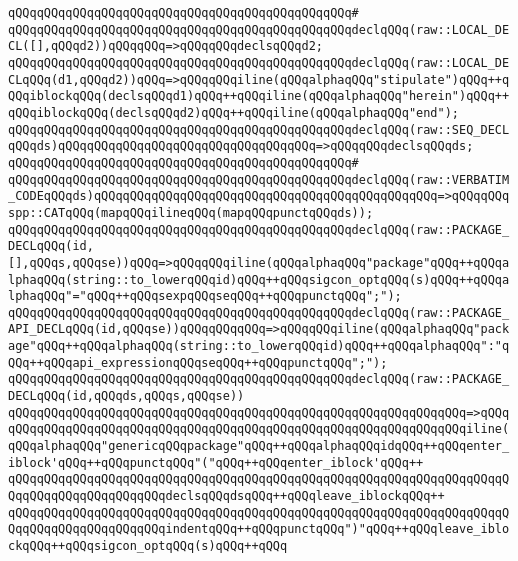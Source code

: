 \verb|qQQqqQQqqQQqqQQqqQQqqQQqqQQqqQQqqQQqqQQqqQQqqQQq#|\newline
\verb|qQQqqQQqqQQqqQQqqQQqqQQqqQQqqQQqqQQqqQQqqQQqqQQqdeclqQQq(raw::LOCAL_DECL([],qQQqd2))qQQqqQQq=>qQQqqQQqdeclsqQQqd2;|\newline
\verb|qQQqqQQqqQQqqQQqqQQqqQQqqQQqqQQqqQQqqQQqqQQqqQQqdeclqQQq(raw::LOCAL_DECLqQQq(d1,qQQqd2))qQQq=>qQQqqQQqiline(qQQqalphaqQQq"stipulate")qQQq++qQQqiblockqQQq(declsqQQqd1)qQQq++qQQqiline(qQQqalphaqQQq"herein")qQQq++qQQqiblockqQQq(declsqQQqd2)qQQq++qQQqiline(qQQqalphaqQQq"end");|\newline
\verb|qQQqqQQqqQQqqQQqqQQqqQQqqQQqqQQqqQQqqQQqqQQqqQQqdeclqQQq(raw::SEQ_DECLqQQqds)qQQqqQQqqQQqqQQqqQQqqQQqqQQqqQQqqQQq=>qQQqqQQqdeclsqQQqds;|\newline
\verb|qQQqqQQqqQQqqQQqqQQqqQQqqQQqqQQqqQQqqQQqqQQqqQQq#|\newline
\verb|qQQqqQQqqQQqqQQqqQQqqQQqqQQqqQQqqQQqqQQqqQQqqQQqdeclqQQq(raw::VERBATIM_CODEqQQqds)qQQqqQQqqQQqqQQqqQQqqQQqqQQqqQQqqQQqqQQqqQQqqQQq=>qQQqqQQqspp::CATqQQq(mapqQQqilineqQQq(mapqQQqpunctqQQqds));|\newline
\verb|qQQqqQQqqQQqqQQqqQQqqQQqqQQqqQQqqQQqqQQqqQQqqQQqdeclqQQq(raw::PACKAGE_DECLqQQq(id,[],qQQqs,qQQqse))qQQq=>qQQqqQQqiline(qQQqalphaqQQq"package"qQQq++qQQqalphaqQQq(string::to_lowerqQQqid)qQQq++qQQqsigcon_optqQQq(s)qQQq++qQQqalphaqQQq"="qQQq++qQQqsexpqQQqseqQQq++qQQqpunctqQQq";");|\newline
\verb|qQQqqQQqqQQqqQQqqQQqqQQqqQQqqQQqqQQqqQQqqQQqqQQqdeclqQQq(raw::PACKAGE_API_DECLqQQq(id,qQQqse))qQQqqQQqqQQq=>qQQqqQQqiline(qQQqalphaqQQq"package"qQQq++qQQqalphaqQQq(string::to_lowerqQQqid)qQQq++qQQqalphaqQQq":"qQQq++qQQqapi_expressionqQQqseqQQq++qQQqpunctqQQq";");|\newline
\newline
\verb|qQQqqQQqqQQqqQQqqQQqqQQqqQQqqQQqqQQqqQQqqQQqqQQqdeclqQQq(raw::PACKAGE_DECLqQQq(id,qQQqds,qQQqs,qQQqse))|\newline
\verb|qQQqqQQqqQQqqQQqqQQqqQQqqQQqqQQqqQQqqQQqqQQqqQQqqQQqqQQqqQQqqQQq=>qQQq|\newline
\verb|qQQqqQQqqQQqqQQqqQQqqQQqqQQqqQQqqQQqqQQqqQQqqQQqqQQqqQQqqQQqqQQqiline(qQQqalphaqQQq"genericqQQqpackage"qQQq++qQQqalphaqQQqidqQQq++qQQqenter_iblock'qQQq++qQQqpunctqQQq"("qQQq++qQQqenter_iblock'qQQq++|\newline
\verb|qQQqqQQqqQQqqQQqqQQqqQQqqQQqqQQqqQQqqQQqqQQqqQQqqQQqqQQqqQQqqQQqqQQqqQQqqQQqqQQqqQQqqQQqqQQqdeclsqQQqdsqQQq++qQQqleave_iblockqQQq++|\newline
\verb|qQQqqQQqqQQqqQQqqQQqqQQqqQQqqQQqqQQqqQQqqQQqqQQqqQQqqQQqqQQqqQQqqQQqqQQqqQQqqQQqqQQqqQQqqQQqindentqQQq++qQQqpunctqQQq")"qQQq++qQQqleave_iblockqQQq++qQQqsigcon_optqQQq(s)qQQq++qQQq|\newline
